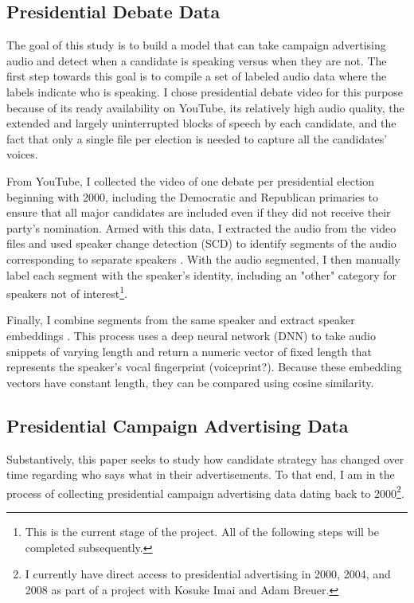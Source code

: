 \documentclass[12pt]{article}
\begin{document}
\subsection*{Presidential Debate Data}
The goal of this study is to build a model that can take campaign advertising audio and detect when a candidate is speaking versus when they are not. The first step towards this goal is to compile a set of labeled audio data where the labels indicate who is speaking. I chose presidential debate video for this purpose because of its ready availability on YouTube, its relatively high audio quality, the extended and largely uninterrupted blocks of speech by each candidate, and the fact that only a single file per election is needed to capture all the candidates' voices.

From YouTube, I collected the video of one debate per presidential election beginning with 2000, including the Democratic and Republican primaries to ensure that all major candidates are included even if they did not receive their party's nomination. Armed with this data, I extracted the audio from the video files and used speaker change detection (SCD) to identify segments of the audio corresponding to separate speakers \citep{bredin2021end}. With the audio segmented, I then manually label each segment with the speaker's identity, including an "other" category for speakers not of interest\footnote{This is the current stage of the project. All of the following steps will be completed subsequently.}. 

Finally, I combine segments from the same speaker and extract speaker embeddings \citep{snyder2020x, Bredin2020, Coria2020}. This process uses a deep neural network (DNN) to take audio snippets of varying length and return a numeric vector of fixed length that represents the speaker's vocal fingerprint (voiceprint?). Because these embedding vectors have constant length, they can be compared using cosine similarity.

\subsection*{Presidential Campaign Advertising Data}

Substantively, this paper seeks to study how candidate strategy has changed over time regarding who says what in their advertisements. To that end, I am in the process of collecting presidential campaign advertising data dating back to 2000\footnote{I currently have direct access to presidential advertising in 2000, 2004, and 2008 as part of a project with Kosuke Imai and Adam Breuer.}.
\end{document}
